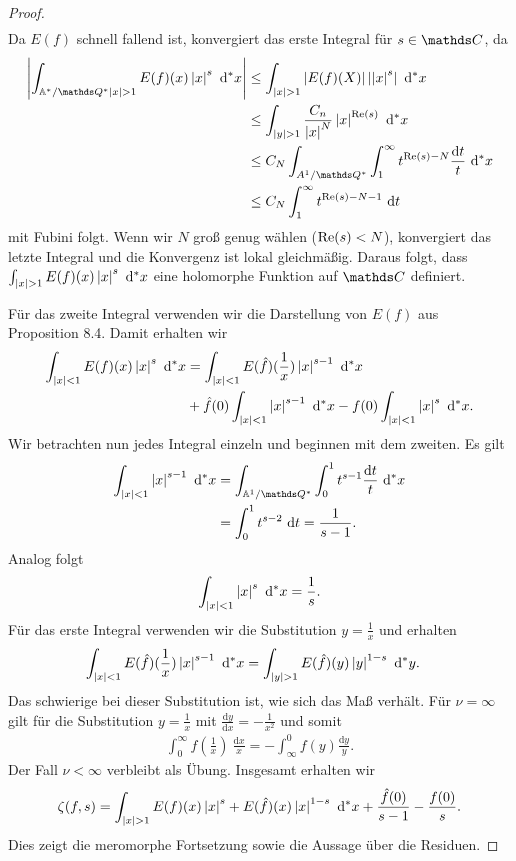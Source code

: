 \begin{proof}
\begin{align*}
\end{align*}
Da $E(f)$ schnell fallend ist, konvergiert das erste Integral für $s\in \C$, da
\begin{align*}
\abs{\int_{\A^\ast /\Q^\ast \abs{x}>1} E(f)(x)\abs{x}^s~\mathrm{d}^\ast x} &\leq \int_{\abs{x}>1} \abs{E(f)(X)} \abs{\abs{x}^s} ~\mathrm{d}^\ast x\\
&\leq \int_{\abs{y}>1} \frac{C_n}{\abs{x}^N} \abs{x}^{\Ret(s)}~\mathrm{d}^\ast x\\
&\leq C_N \int_{A^1/\Q^\ast} \int_1^\infty t^{\Ret(s)-N} \frac{\mathrm{d}t}{t}~\mathrm{d}^\ast x\\
&\leq C_N \int_1^\infty t^{\Ret(s)-N-1}~\mathrm{d}t
\end{align*}
mit Fubini folgt.
Wenn wir $N$ groß genug wählen ($\operatorname{Re}(s)<N$), konvergiert das letzte Integral
und die Konvergenz ist lokal gleichmäßig.
Daraus folgt, dass $\int_{\left\vert x\right\vert>1} E(f)(x)\left\vert x\right\vert^s~\mathrm{d}^\ast x$ eine holomorphe Funktion auf $\C$ definiert.

Für das zweite Integral verwenden wir die Darstellung von $E(f)$ aus
Proposition 8.4.
Damit erhalten wir
\begin{align*}
\int_{\left\vert x\right\vert<1} E(f)(x)\left\vert x\right\vert^s~\mathrm{d}^\ast x &= \int_{\left\vert x\right\vert<1}E(\hat{f})(\frac{1}{x})\left\vert x\right\vert^{s-1}~\mathrm{d}^\ast x\\
&+ \hat{f}(0)\int_{\left\vert x\right\vert<1} \left\vert x\right\vert^{s-1} ~\mathrm{d}^\ast x -f(0)\int_{\left\vert x\right\vert<1}\left\vert x\right\vert^s ~\mathrm{d}^\ast x.
\end{align*}
Wir betrachten nun jedes Integral einzeln und beginnen mit dem zweiten.
Es gilt
\begin{align*}
\int_{\abs{x}<1}\abs{x}^{s-1}~\mathrm{d}^\ast x &=\int_{\A^1/\Q^\ast} \int_0^1 t^{s-1}\frac{\mathrm{d}t}{t}~\mathrm{d}^\ast x\\
&=\int_0^1 t^{s-2}~\mathrm{d}t=\frac{1}{s-1}.
\end{align*}
Analog folgt
\begin{align*}
\int_{\left\vert x\right\vert<1} \left\vert x\right\vert^s~\mathrm{d}^\ast x =\frac{1}{s}.
\end{align*}
Für das erste Integral verwenden wir die Substitution $y=\frac{1}{x}$ und erhalten
\begin{align*}
\int_{\left\vert x\right\vert<1}E(\hat{f})(\frac{1}{x})\left\vert x\right\vert^{s-1}~\mathrm{d}^\ast x&=\int_{\left\vert y\right\vert>1} E(\hat{f})(y)\left\vert y\right\vert^{1-s}~\mathrm{d}^\ast y.
\end{align*}
Das schwierige bei dieser Substitution ist, wie sich das Maß verhält.
Für $\nu=\infty$ gilt für die Substitution $y=\frac{1}{x}$ mit $\frac{\mathrm{d}y}{\mathrm{d}x}=-\frac{1}{x^2}$ und somit
\begin{align*}
\int_0^\infty f(\frac{1}{x})~\frac{\mathrm{d}x}{x}=-\int_{\infty}^0 f(y)\frac{\mathrm{d}y}{y}.
\end{align*}
Der Fall $\nu<\infty$ verbleibt als Übung.
Insgesamt erhalten wir
\begin{align*}
\zeta(f,s)=\int_{\left\vert x\right\vert>1}E(f)(x)\left\vert x\right\vert^s +E(\hat{f})(x)\left\vert x\right\vert^{1-s}~\mathrm{d}^\ast x +\frac{\hat{f}(0)}{s-1}-\frac{f(0)}{s}.
\end{align*}
Dies zeigt die meromorphe Fortsetzung sowie die Aussage über die Residuen.
\end{proof}
